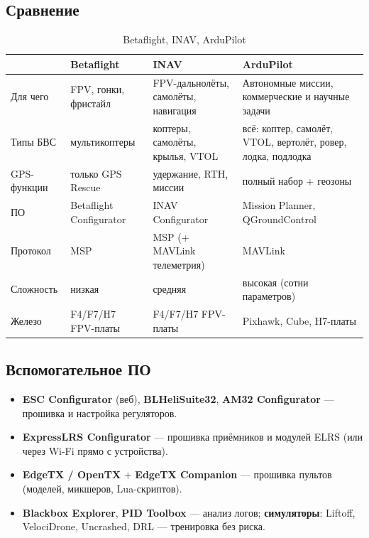 \subsection{Сравнение}
\begin{table}[H]\centering\small
\renewcommand{\arraystretch}{1.3}
\begin{tabularx}{\linewidth}{@{}p{28mm} X X X@{}}
\toprule
 & \textbf{Betaflight} & \textbf{INAV} & \textbf{ArduPilot} \\
\midrule
Для чего & FPV, гонки, фристайл & FPV-дальнолёты, самолёты, навигация & Автономные миссии, коммерческие и научные задачи \\
Типы БВС & мультикоптеры & коптеры, самолёты, крылья, VTOL & всё: коптер, самолёт, VTOL, вертолёт, ровер, лодка, подлодка \\
GPS-функции & только GPS Rescue & удержание, RTH, миссии & полный набор + геозоны \\
ПО & Betaflight Configurator & INAV Configurator & Mission Planner, QGroundControl \\
Протокол & MSP & MSP (+ MAVLink телеметрия) & MAVLink \\
Сложность & низкая & средняя & высокая (сотни параметров) \\
Железо & F4/F7/H7 FPV-платы & F4/F7/H7 FPV-платы & Pixhawk, Cube, H7-платы \\
\bottomrule
\end{tabularx}
\caption{Betaflight, INAV, ArduPilot}
\end{table}

\subsection{Вспомогательное ПО}
\begin{itemize}
\item \textbf{ESC Configurator} (веб), \textbf{BLHeliSuite32}, \textbf{AM32 Configurator} — прошивка и настройка регуляторов.
\item \textbf{ExpressLRS Configurator} — прошивка приёмников и модулей ELRS (или через Wi-Fi прямо с устройства).
\item \textbf{EdgeTX / OpenTX} + \textbf{EdgeTX Companion} — прошивка пультов (моделей, микшеров, Lua-скриптов).
\item \textbf{Blackbox Explorer}, \textbf{PID Toolbox} — анализ логов; \textbf{симуляторы}: Liftoff, VelociDrone, Uncrashed, DRL — тренировка без риска.
\end{itemize}


